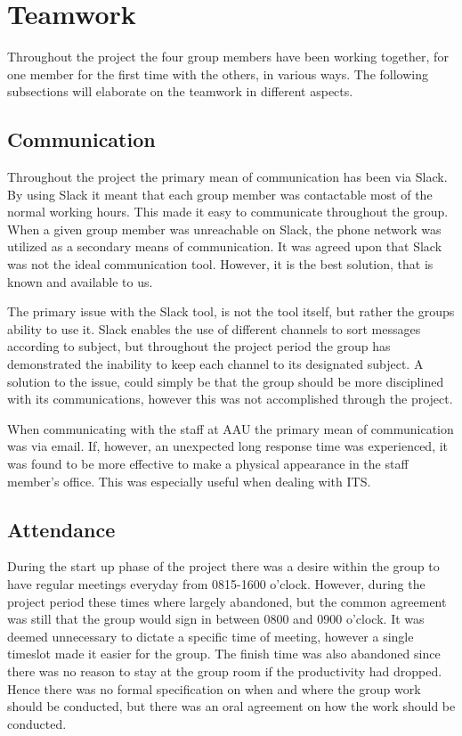 \section{Teamwork}
Throughout the project the four group members have been working together, for one member for the first time with the others, in various ways.
The following subsections will elaborate on the teamwork in different aspects.

\subsection{Communication}
Throughout the project the primary mean of communication has been via Slack.
By using Slack it meant that each group member was contactable most of the normal working hours.
This made it easy to communicate throughout the group.
When a given group member was unreachable on Slack, the phone network was utilized as a secondary means of communication.
It was agreed upon that Slack was not the ideal communication tool.
However, it is the best solution, that is known and available to us.

The primary issue with the Slack tool, is not the tool itself, but rather the groups ability to use it. 
Slack enables the use of different channels to sort messages according to subject, but throughout the project period the group has demonstrated the inability to keep each channel to its designated subject. 
A solution to the issue, could simply be that the group should be more disciplined with its communications, however this was not accomplished through the project.

When communicating with the staff at AAU the primary mean of communication was via email.
If, however, an unexpected long response time was experienced, it was found to be more effective to make a physical appearance in the staff member's office.
This was especially useful when dealing with ITS.

\subsection{Attendance}
During the start up phase of the project there was a desire within the group to have regular meetings everyday from 0815-1600 o'clock.
However, during the project period these times where largely abandoned, but the common agreement was still that the group would sign in between 0800 and 0900 o'clock.
It was deemed unnecessary to dictate a specific time of meeting, however a single timeslot made it easier for the group.
The finish time was also abandoned since there was no reason to stay at the group room if the productivity had dropped.
Hence there was no formal specification on when and where the group work should be conducted, but there was an oral agreement on how the work should be conducted.
